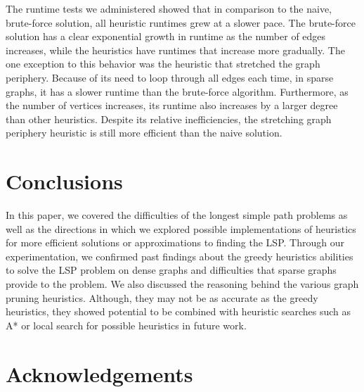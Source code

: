 \documentclass[twocolumn,showpacs,%
  nofootinbib,aps,superscriptaddress,%
  eqsecnum,prd,notitlepage,showkeys,11pt]{article}
\begin{document}
The runtime tests we administered showed that in comparison to the naive, brute-force solution, all heuristic runtimes grew at a slower pace. The brute-force solution has a clear exponential growth in runtime as the number of edges increases, while the heuristics have runtimes that increase more gradually. The one exception to this behavior was the heuristic that stretched the graph periphery. Because of its need to loop through all edges each time, in sparse graphs, it has a slower runtime than the brute-force algorithm. Furthermore, as the number of vertices increases, its runtime also increases by a larger degree than other heuristics. Despite its relative inefficiencies, the stretching graph periphery heuristic is still more efficient than the naive solution.

\section{\centering Conclusions}
In this paper, we covered the difficulties of the longest simple path problems as well as the directions in which we explored possible implementations of heuristics for more efficient solutions or approximations to finding the LSP. Through our experimentation, we confirmed past findings about the greedy heuristics abilities to solve the LSP problem on dense graphs and difficulties that sparse graphs provide to the problem. We also discussed the reasoning behind the various graph pruning heuristics. Although, they may not be as accurate as the greedy heuristics, they showed potential to be combined with heuristic searches such as A* or local search for possible heuristics in future work.

\section*{Acknowledgements}



\end{document}
